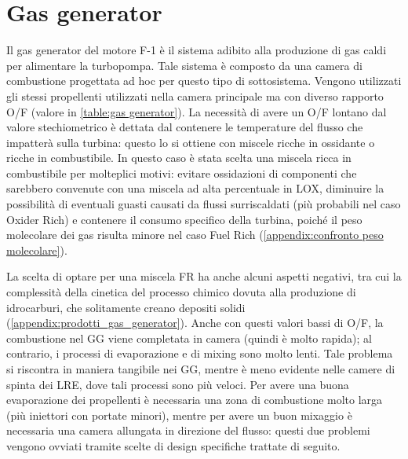 \section{Gas generator}
\label{sec:gas generator}

Il gas generator del motore F-1 è il sistema adibito alla produzione di gas caldi per alimentare la turbopompa. Tale sistema è composto da una camera di combustione progettata ad hoc per questo tipo di sottosistema.
Vengono utilizzati gli stessi propellenti utilizzati nella camera principale ma con diverso rapporto O/F (valore in \autoref{table:gas generator}). La necessità di avere un O/F lontano dal valore stechiometrico è dettata dal contenere le temperature del flusso che impatterà sulla turbina: questo lo si ottiene con miscele ricche in ossidante o ricche in combustibile.
In questo caso è stata scelta una miscela ricca in combustibile per molteplici motivi: evitare ossidazioni di componenti che sarebbero convenute con una miscela ad alta percentuale in LOX, diminuire la possibilità di eventuali guasti causati da flussi surriscaldati (più probabili nel caso Oxider Rich) e contenere il consumo specifico della turbina, poiché il peso molecolare dei gas risulta minore nel caso Fuel Rich (\autoref{appendix:confronto peso molecolare}).

La scelta di optare per una miscela FR ha anche alcuni aspetti negativi, tra cui la complessità della cinetica del processo chimico dovuta alla produzione di idrocarburi, che solitamente creano depositi solidi (\autoref{appendix:prodotti_gas_generator}).
Anche con questi valori bassi di O/F, la combustione nel GG viene completata in camera (quindi è molto rapida); al contrario, i processi di evaporazione e di mixing sono molto lenti. Tale problema si riscontra in maniera tangibile nei GG, mentre è meno evidente nelle camere di spinta dei LRE, dove tali processi sono più veloci.
Per avere una buona evaporazione dei propellenti è necessaria una zona di combustione molto larga (più iniettori con portate minori), mentre per avere un buon mixaggio è necessaria una camera allungata in direzione del flusso: questi due problemi vengono ovviati tramite scelte di design specifiche trattate di seguito.

